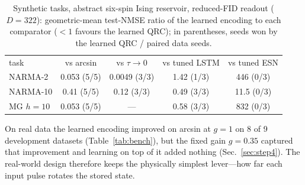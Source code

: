 \documentclass[aps,prresearch,preprint,superscriptaddress,amsmath,amssymb,floatfix]{revtex4-2}
\begin{document}
\begin{table}[t]
\caption{\label{tab:synth}Synthetic tasks, abstract six-spin Ising reservoir,
reduced-FID readout ($D=322$): geometric-mean test-NMSE ratio of the learned encoding to
each comparator ($<1$ favours the learned QRC); in parentheses, seeds won by the
learned QRC / paired data seeds.}
\begin{ruledtabular}
\begin{tabular}{lcccc}
task & vs arcsin & vs $\tau\to0$ & vs tuned LSTM & vs tuned ESN \\ \colrule
NARMA-2      & 0.053 (5/5) & 0.0049 (3/3) & 1.42 (1/3) & 446 (0/3) \\
NARMA-10     & 0.41 (5/5)  & 0.12 (3/3)   & 0.49 (3/3) & 11.5 (0/3) \\
MG $h{=}10$  & 0.053 (5/5) & ---          & 0.58 (3/3) & 832 (0/3) \\
\end{tabular}
\end{ruledtabular}
\end{table}

On real data the learned encoding improved on arcsin at $g=1$ on 8 of 9 development
datasets (Table~\ref{tab:bench}), but the fixed gain $g=0.35$ captured that improvement
and learning on top of it added nothing (Sec.~\ref{sec:step4}). The real-world design
therefore keeps the physically simplest lever---how far each input pulse rotates the
stored state.

\end{document}
